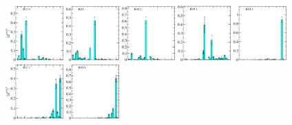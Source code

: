 \begin{figure}[H]
    \includegraphics[width=0.1975\textwidth]{figures/sigmas/hu/zfactors/zfactor_isotriplet-S-1-P000-Hu_1-ROT-0.pdf}
    \includegraphics[width=0.18\textwidth]{figures/sigmas/hu/zfactors/zfactor_isotriplet-S-1-P000-Hu_1-ROT-1.pdf}
    \includegraphics[width=0.18\textwidth]{figures/sigmas/hu/zfactors/zfactor_isotriplet-S-1-P000-Hu_1-ROT-2.pdf}
    \includegraphics[width=0.18\textwidth]{figures/sigmas/hu/zfactors/zfactor_isotriplet-S-1-P000-Hu_1-ROT-3.pdf}
    \includegraphics[width=0.18\textwidth]{figures/sigmas/hu/zfactors/zfactor_isotriplet-S-1-P000-Hu_1-ROT-4.pdf}\\
    \includegraphics[width=0.1975\textwidth]{figures/sigmas/hu/zfactors/zfactor_isotriplet-S-1-P000-Hu_1-ROT-5.pdf}
    \includegraphics[width=0.18\textwidth]{figures/sigmas/hu/zfactors/zfactor_isotriplet-S-1-P000-Hu_1-ROT-6.pdf}

\end{figure}
